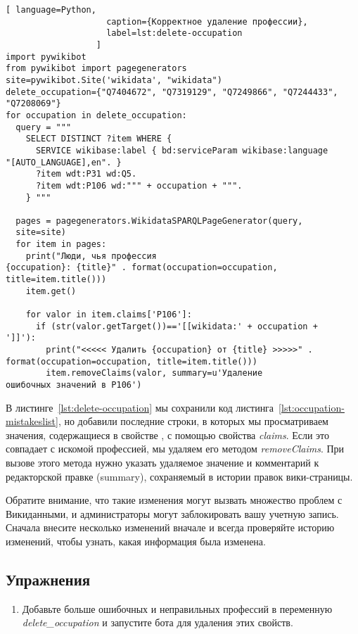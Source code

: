 \begin{lstlisting}[ language=Python,
                    caption={Корректное удаление профессии},
                    label=lst:delete-occupation
                  ]
import pywikibot
from pywikibot import pagegenerators
site=pywikibot.Site('wikidata', "wikidata")
delete_occupation={"Q7404672", "Q7319129", "Q7249866", "Q7244433", 
"Q7208069"}
for occupation in delete_occupation:
  query = """
    SELECT DISTINCT ?item WHERE {
      SERVICE wikibase:label { bd:serviceParam wikibase:language 
"[AUTO_LANGUAGE],en". }
      ?item wdt:P31 wd:Q5.
      ?item wdt:P106 wd:""" + occupation + """.
    } """

  pages = pagegenerators.WikidataSPARQLPageGenerator(query, 
  site=site)
  for item in pages:
    print("Люди, чья профессия 
{occupation}: {title}" . format(occupation=occupation, 
title=item.title()))
    item.get()

    for valor in item.claims['P106']:
      if (str(valor.getTarget())=='[[wikidata:' + occupation + 
']]'):
        print("<<<<< Удалить {occupation} от {title} >>>>>" . 
format(occupation=occupation, title=item.title()))
        item.removeClaims(valor, summary=u'Удаление 
ошибочных значений в P106')
\end{lstlisting} 

В листинге~\ref{lst:delete-occupation} мы сохранили код листинга~\ref{lst:occupation-mistakeslist}, но добавили последние строки, в которых мы просматриваем значения, содержащиеся в свойстве , с помощью свойства \textit{claims}. Если это совпадает с искомой профессией, мы удаляем его методом \textit{removeClaims}. При вызове этого метода нужно указать удаляемое значение и комментарий к редакторской правке (summary), сохраняемый в истории правок вики-страницы.

Обратите внимание, что такие изменения могут вызвать множество проблем с Викиданными, и администраторы могут заблокировать вашу учетную запись. Сначала внесите несколько изменений вначале и всегда проверяйте историю изменений, чтобы узнать, какая информация была изменена.

\subsection{Упражнения}

\begin{enumerate} 
\item Добавьте больше ошибочных и неправильных профессий в переменную \textit{delete\_occupation} и запустите бота для удаления этих свойств.
\end{enumerate}